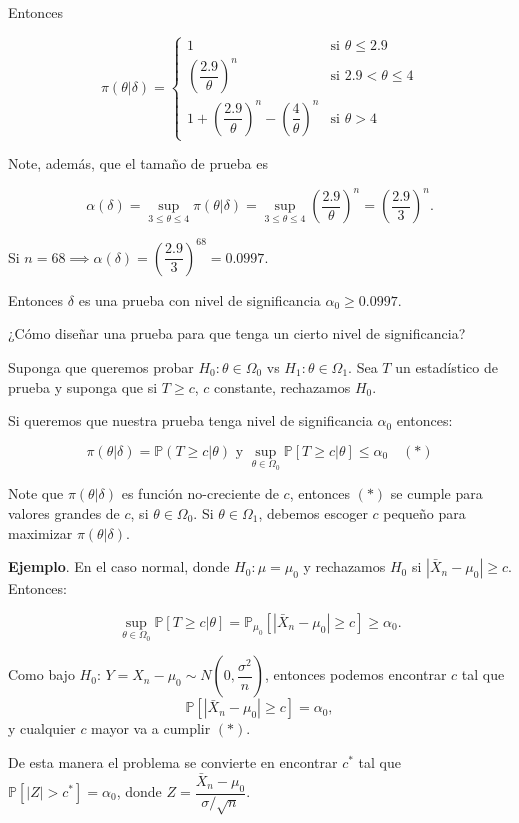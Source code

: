 \documentclass[
  12pt,
]{book}
\begin{document}
Entonces

\[\pi(\theta|\delta) = \begin{cases}1 & \text{si } \theta\leq 2.9 \\
\left(\dfrac{2.9}{\theta}\right)^n& \text{si } 2.9 <\theta\leq 4\\
1+\left(\dfrac{2.9}\theta\right)^n-\left(\dfrac{4}\theta\right)^n & \text{si } \theta >4\end{cases}\]

Note, además, que el tamaño de prueba es

\[\alpha(\delta) = \sup_{3\leq\theta\leq 4} \pi(\theta|\delta) = \sup_{3\leq\theta\leq 4}\left(\dfrac{2.9}{\theta}\right)^n = \left(\dfrac{2.9}{3}\right)^n.\]

Si \(n = 68 \implies \alpha(\delta)= \left(\dfrac{2.9}{3}\right)^{68} = 0.0997.\)

Entonces \(\delta\) es una prueba con nivel de significancia \(\alpha_0\geq 0.0997\).

¿Cómo diseñar una prueba para que tenga un cierto nivel de significancia?

Suponga que queremos probar \(H_0: \theta \in \Omega_0\) vs \(H_1: \theta\in\Omega_1\). Sea \(T\) un estadístico de prueba y suponga que si \(T\geq c\), \(c\) constante, rechazamos \(H_0\).

Si queremos que nuestra prueba tenga nivel de significancia \(\alpha_0\) entonces:

\[\pi(\theta|\delta) = \mathbb P(T\geq c|\theta)\text{ y } \sup_{\theta \in \Omega_0}\mathbb P[T\geq c|\theta] \leq \alpha_0 \quad (*)\]

Note que \(\pi(\theta|\delta)\) es función no-creciente de \(c\), entonces \((*)\) se cumple para valores grandes de \(c\), si \(\theta\in\Omega_0\). Si \(\theta \in \Omega_1\), debemos escoger \(c\) pequeño para maximizar \(\pi(\theta|\delta)\).

\textbf{Ejemplo}. En el caso normal, donde \(H_0: \mu = \mu_0\) y rechazamos \(H_0\) si \(|\bar X_n-\mu_0|\geq c\). Entonces:

\[\sup_{\theta\in\Omega_0} \mathbb P [T\geq c|\theta] = \mathbb P_{\mu_0}[|\bar X_n-\mu_0|\geq c]\geq \alpha_0.\]

Como bajo \(H_0\): \(Y = X_n-\mu_0 \sim N\left(0,\dfrac{\sigma^2}{n}\right)\), entonces podemos encontrar \(c\) tal que
\[\mathbb P[|\bar X_n-\mu_0|\geq c] = \alpha_0,\]
y cualquier \(c\) mayor va a cumplir \((*)\).

De esta manera el problema se convierte en encontrar \(c^*\) tal que \(\mathbb P[|Z|>c^*] = \alpha_0\), donde \(Z = \dfrac{\bar X_n - \mu_0}{\sigma/\sqrt n}\).
\end{document}
